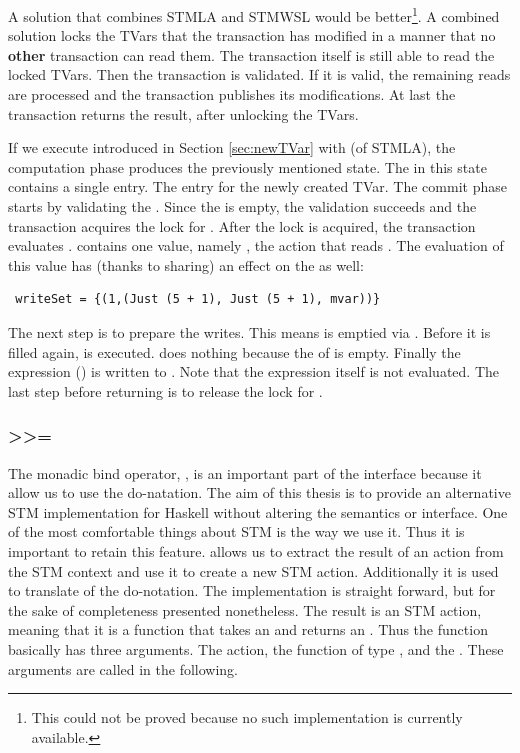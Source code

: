 A solution that combines STMLA and STMWSL would be better\footnote{This could 
not be proved because no such implementation is currently available.}.
A combined solution locks the TVars that the transaction has modified in a 
manner that no \textbf{other} transaction can read them. The transaction itself
is still able to read the locked TVars. Then the transaction is validated. 
If it is valid, the remaining reads are processed and the transaction publishes
its modifications. At last the transaction returns the result, after unlocking
the TVars.

If we execute  introduced in Section \ref{sec:newTVar} with 
 (of STMLA), the computation phase produces the previously mentioned state.
The  in this state contains a single entry. The entry for the
newly created TVar. The commit phase starts by validating the . 
Since the  is empty, the validation succeeds and the transaction
acquires the lock for . After the lock is acquired, the transaction 
evaluates .  contains one value, namely ,
the  action that reads . The evaluation of this value 
has (thanks to sharing) an effect on the  as well:
\begin{lstlisting}
 writeSet = {(1,(Just (5 + 1), Just (5 + 1), mvar))} 
\end{lstlisting}
The next step is to prepare the writes. This means  is emptied via 
. Before it is filled again,  is executed. 
does nothing because the  of  is empty. Finally the expression ()
is written to . Note that the expression itself is not evaluated. The last step
before returning \code{()} is to release the lock for .

\subsubsection{>>=}
The monadic bind operator, \code{>>=}, is an important part of the interface because it allow us 
to use the do-natation. The aim of this thesis is to provide an alternative STM 
implementation for Haskell without altering the semantics or interface. One of 
the most comfortable things about STM is the way we use it. Thus it is important to 
retain this feature.  allows us to 
extract the result of an  action from the STM context and use it to create 
a new STM action. Additionally it is used to translate \code{<-} of the do-notation.
The implementation is straight forward, but for the sake of completeness presented
nonetheless. The result is an STM action, meaning that it is a function that takes 
an  and returns an . Thus the function \code{>>=} basically
has three arguments. The  action, the function of type ,
and the . These arguments are called 
in the following. 

